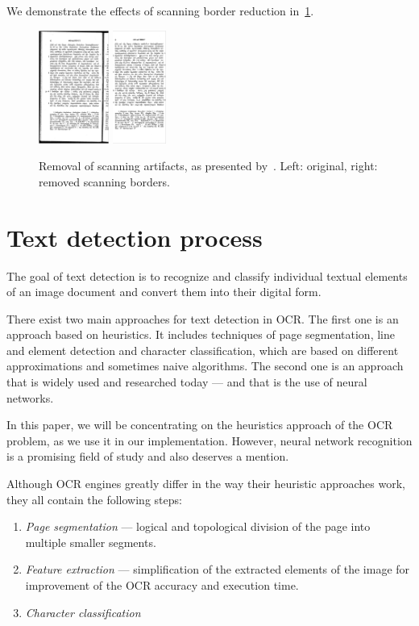 We demonstrate the effects of scanning border reduction in~\cref{fig:marginalNoise}.

\begin{figure}
\centering

\includegraphics[height=10em]{img/preprocessing/scan_borders_orig.png}
\qquad
\includegraphics[height=10em]{img/preprocessing/scan_borders_result.png}

\caption{Removal of scanning artifacts, as presented by~\citet{TesseractQual}. Left: original, right: removed scanning borders.}
\label{fig:marginalNoise}
\end{figure}

\section{Text detection process}

The goal of text detection is to recognize and classify individual textual elements of an image document and convert them into their digital form.

There exist two main approaches for text detection in OCR. The first one is an approach based on heuristics. It includes techniques of page segmentation, line and element detection and character classification, which are based on different approximations and sometimes naive algorithms. The second one is an approach that is widely used and researched today --- and that is the use of neural networks.

In this paper, we will be concentrating on the heuristics approach of the OCR problem, as we use it in our implementation. However, neural network recognition is a promising field of study and also deserves a mention.

Although OCR engines greatly differ in the way their heuristic approaches work, they all contain the following steps:
\begin{enumerate}
    \item \emph{Page segmentation} --- logical and topological division of the page into multiple smaller segments.
    \item \emph{Feature extraction} --- simplification of the extracted elements of the image for improvement of the OCR accuracy and execution time.
    \item \emph{Character classification}
\end{enumerate}

